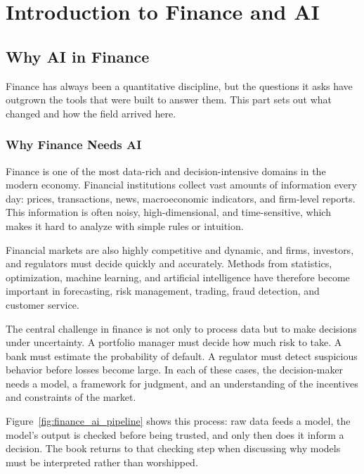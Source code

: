 \documentclass[../ai_in_finance]{subfiles}
\begin{document}
\chapter{Introduction to Finance and AI}

\section{Why AI in Finance}

Finance has always been a quantitative discipline, but the questions it asks have outgrown the tools that were built to answer them. This part sets out what changed and how the field arrived here.

\subsection{Why Finance Needs AI}

Finance is one of the most data-rich and decision-intensive domains in the modern economy. Financial institutions collect vast amounts of information every day: prices, transactions, news, macroeconomic indicators, and firm-level reports. This information is often noisy, high-dimensional, and time-sensitive, which makes it hard to analyze with simple rules or intuition.

Financial markets are also highly competitive and dynamic, and firms, investors, and regulators must decide quickly and accurately. Methods from statistics, optimization, machine learning, and artificial intelligence have therefore become important in forecasting, risk management, trading, fraud detection, and customer service.

The central challenge in finance is not only to process data but to make decisions under uncertainty. A portfolio manager must decide how much risk to take. A bank must estimate the probability of default. A regulator must detect suspicious behavior before losses become large. In each of these cases, the decision-maker needs a model, a framework for judgment, and an understanding of the incentives and constraints of the market.

Figure~\ref{fig:finance_ai_pipeline} shows this process: raw data feeds a model, the model's output is checked before being trusted, and only then does it inform a decision. The book returns to that checking step when discussing why models must be interpreted rather than worshipped.
\end{document}
